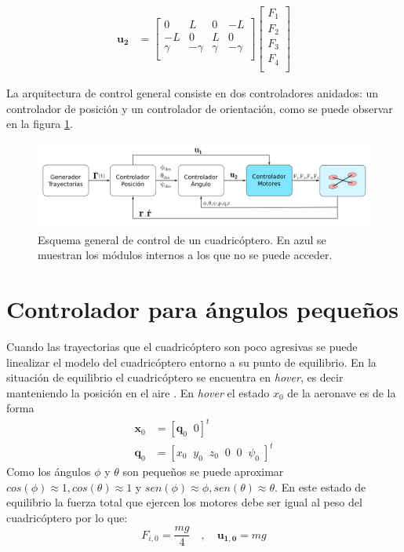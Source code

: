 \begin{align}
	\mathbf{u_2}  &= \begin{bmatrix}
		0&L&0&-L\\
		-L&0&L&0\\
		\gamma&-\gamma&\gamma&-\gamma\\
	\end{bmatrix}\begin{bmatrix} F_1\\ 
	F_2\\ 
	F_3\\ 
	F_4\\ 
\end{bmatrix}\label{eq:u2}
\end{align} 

La arquitectura de control general consiste en dos controladores anidados: un controlador de posición y un controlador de orientación, como se puede observar en la figura \ref{control:1}.



\begin{figure}[htb!]
	\centering
	\includegraphics[width=\textwidth]{imagenes/diagramaControl1}
	\caption{Esquema general de control de un cuadricóptero. En azul se muestran los módulos internos a los que no se puede acceder. }
	\label{control:1}
\end{figure}


\section{Controlador para ángulos pequeños}
Cuando las trayectorias que el cuadricóptero son poco agresivas se puede linealizar el modelo del cuadricóptero entorno a su punto de equilibrio. En la situación de equilibrio el cuadricóptero se encuentra en \textit{hover}, es decir manteniendo la posición en el aire . En \textit{hover} el estado $x_0$ de la aeronave es de la forma 
\begin{align}
	\mathbf{x}_0 &= [\mathbf{q}_0 \;\; 0]^t\nonumber\\
	\mathbf{q}_0 &= [x_0  \;\;y_0  \;\;z_0  \;\;0  \;\;0  \;\;\psi_0  \;]^t
\end{align}
Como los ángulos $\phi$ y $\theta$ son pequeños se puede aproximar $cos(\phi) \approx 1 , cos(\theta) \approx 1$ y $sen(\phi) \approx \phi , sen(\theta) \approx \theta$. En este estado de equilibrio la fuerza total que ejercen los motores debe ser igual al peso del cuadricóptero por lo que:
\begin{equation}
	F_{i,0}  = \frac{mg}{4}\quad,\quad \mathbf{u_{1,0}} = mg
\end{equation}

